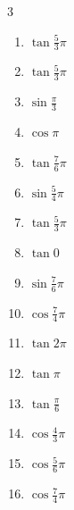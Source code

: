 \begin{multicols}{3}
\begin{enumerate}
  \item $\displaystyle \tan{\frac{5}{3}\pi}$

  \item $\displaystyle \tan{\frac{5}{3}\pi}$

  \item $\displaystyle \sin{\frac{\pi}{3}}$

  \item $\displaystyle \cos{\pi}$
        \phantom{$\displaystyle =-1$}

  \item $\displaystyle \tan{\frac{7}{6}\pi}$

  \item $\displaystyle \sin{\frac{5}{4}\pi}$

  \item $\displaystyle \tan{\frac{5}{3}\pi}$

  \item $\displaystyle \tan{0}$
        \phantom{$\displaystyle =0$}

  \item $\displaystyle \sin{\frac{7}{6}\pi}$

  \item $\displaystyle \cos{\frac{7}{4}\pi}$

  \item $\displaystyle \tan{2\pi}$
        \phantom{$\displaystyle =0$}

  \item $\displaystyle \tan{\pi}$
        \phantom{$\displaystyle =0$}

  \item $\displaystyle \tan{\frac{\pi}{6}}$

  \item $\displaystyle \cos{\frac{4}{3}\pi}$

  \item $\displaystyle \cos{\frac{5}{6}\pi}$

  \item $\displaystyle \cos{\frac{7}{4}\pi}$


\end{enumerate}
\end{multicols}
